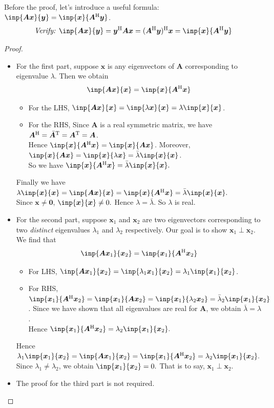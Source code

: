 Before the proof, let's introduce a useful formula: $\inp{\bm{Ax}}{\bm y}=\inp{\bm x}{\bm A\Her\bm y}$.\\
\[
\textit{Verify: }\inp{\bm{Ax}}{\bm y}=\bm y\Her\bm{Ax}=(\bm A\Her\bm y)\Her\bm x=\inp{\bm x}{\bm A\Her\bm y}
\]
\begin{proof}
\begin{itemize}
\item
For the first part, suppose $\bm x$ is any eigenvectors of $\bm A$ corresponding to eigenvalue $\lambda$. Then we obtain
\[
\inp{\bm{Ax}}{\bm x}=\inp{\bm x}{\bm A\Her\bm x}
\]
\begin{itemize}
\item
For the LHS, $\inp{\bm{Ax}}{\bm x}=\inp{\lambda\bm x}{\bm x}=\lambda\inp{\bm x}{\bm x}$.
\item
For the RHS, Since $\bm A$ is a real symmetric matrix, we have $\bm A^{\mathrm H}=\bar{\bm A}^{\mathrm T}=\bm A^{\mathrm T}=\bm A$.\\ Hence $\inp{\bm x}{\bm A\Her\bm x}=\inp{\bm x}{\bm{Ax}}$. Moreover, $\inp{\bm x}{\bm{Ax}}=\inp{\bm x}{\lambda\bm x}=\bar\lambda\inp{\bm x}{\bm x}$.\\ So we have $\inp{\bm x}{\bm A\Her\bm x}=\bar\lambda\inp{\bm x}{\bm x}.$
\end{itemize}
Finally we have $\lambda\inp{\bm x}{\bm x}=\inp{\bm{Ax}}{\bm x}=\inp{\bm x}{\bm A\Her\bm x}=\bar\lambda\inp{\bm x}{\bm x}.$\\
Since $\bm x\ne\bm 0$, $\inp{\bm x}{\bm x}\ne0.$ Hence $\lambda=\bar\lambda$. So $\lambda$ is real.
\item
For the second part, suppose $\bm x_1$ and $\bm x_2$ are two eigenvectors corresponding to two \emph{distinct} eigenvalues $\lambda_1$ and $\lambda_2$ respectively. Our goal is to show $\bm x_1\perp\bm x_2$. We find that
\[
\inp{\bm A\bm x_1}{\bm x_2}=\inp{\bm x_1}{\bm A\Her\bm x_2}
\]
\begin{itemize}
\item
For LHS, $\inp{\bm A\bm x_1}{\bm x_2}=\inp{\lambda_1\bm x_1}{\bm x_2}=\lambda_1\inp{\bm x_1}{\bm x_2}$.
\item
For RHS, $\inp{\bm x_1}{\bm A\Her\bm x_2}=\inp{\bm x_1}{\bm A\bm x_2}=\inp{\bm x_1}{\lambda_2\bm x_2}=\bar\lambda_2\inp{\bm x_1}{\bm x_2}$. Since we have shown that all eigenvalues are real for $\bm A$, we obtain $\bar\lambda=\lambda$.\\
Hence $\inp{\bm x_1}{\bm A\Her\bm x_2}=\lambda_2\inp{\bm x_1}{\bm x_2}.$
\end{itemize}
Hence $\lambda_1\inp{\bm x_1}{\bm x_2}=\inp{\bm A\bm x_1}{\bm x_2}=\inp{\bm x_1}{\bm A\Her\bm x_2}=\lambda_2\inp{\bm x_1}{\bm x_2}.$\\ Since $\lambda_1\ne\lambda_2$, we obtain $\inp{\bm x_1}{\bm x_2}=0.$ That is to say, $\bm x_1\perp\bm x_2.$
\item
The proof for the third part is not required.
\end{itemize}
\end{proof}
